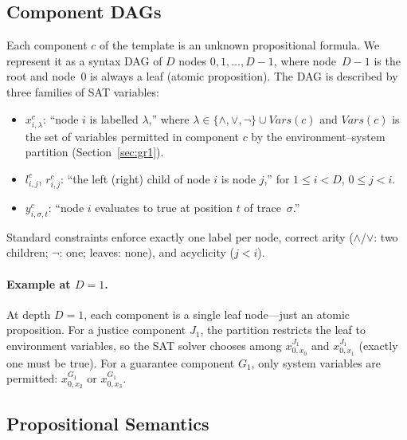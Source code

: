 

\subsection{Component DAGs}\label{sec:component-dags}

Each component $c$ of the \GRone template is an unknown
propositional formula.
We represent it as a syntax DAG of $D$ nodes
$0, 1, \ldots, D{-}1$, where node~$D{-}1$ is the root and
node~0 is always a leaf (atomic proposition).
The DAG is described by three families of SAT variables:
\begin{itemize}
\item $x^c_{i,\lambda}$: ``node $i$ is labelled $\lambda$,'' where
      $\lambda \in \{\land, \lor, \lnot\} \cup \mathit{Vars}(c)$
      and $\mathit{Vars}(c)$ is the set of variables permitted in
      component $c$ by the environment--system partition
      (Section~\ref{sec:gr1}).
\item $l^c_{i,j}$, $r^c_{i,j}$: ``the left (right) child of
      node $i$ is node $j$,'' for
      $1 \le i < D$, $0 \le j < i$.
\item $y^c_{i,\sigma,t}$: ``node $i$
      evaluates to true at position $t$ of trace~$\sigma$.''
\end{itemize}
Standard constraints enforce exactly one label per node,
correct arity ($\land$/$\lor$: two children; $\lnot$: one;
leaves: none), and acyclicity ($j < i$).

\paragraph{Example at $D = 1$.}
At depth $D = 1$, each component is a single leaf node---just an
atomic proposition.
For a justice component $J_1$, the partition restricts the leaf to
environment variables, so the SAT solver chooses among
$x^{J_1}_{0,x_0}$ and $x^{J_1}_{0,x_1}$ (exactly one must be true).
For a guarantee component $G_1$, only system variables are
permitted: $x^{G_1}_{0,x_2}$ or $x^{G_1}_{0,x_3}$.

\subsection{Propositional Semantics}\label{sec:semantics}

